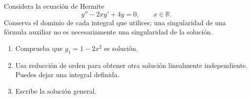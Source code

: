 Considera la ecuación de Hermite
\[y''-2xy'+4y=0,\qquad x\in\mathbb R.\]
Conserva el dominio de cada integral que utilices; una singularidad de una fórmula auxiliar no es necesariamente una singularidad de la solución.

\begin{enumerate}[label=(\alph*),ref=\alph*,leftmargin=*]
\item Comprueba que \(y_1=1-2x^2\) es solución.
\item Usa reducción de orden para obtener otra solución linealmente independiente. Puedes dejar una integral definida.
\item Escribe la solución general.
\end{enumerate}
